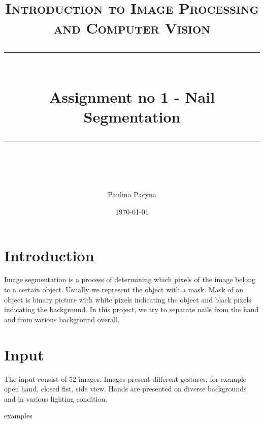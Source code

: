 \documentclass{article} %
\title{
\normalfont \normalsize
\textsc{Introduction to Image Processing and Computer Vision} \\
[10pt]
\rule{\linewidth}{0.5pt} \\[6pt]
\huge Assignment no 1 - Nail Segmentation \\
\rule{\linewidth}{2pt}  \\[10pt]
}
\author{Paulina Pacyna}
\date{\normalsize \today}
\begin{document}
\maketitle
\noindent




%
%
%
%





\section{Introduction}
Image segmentation is a process of determining which pixels of the image belong to a certain object.
Usually we represent the object with a mask. Mask of an object is binary picture with white pixels indicating the object and black pixels indicating the background. In this project, we try to separate nails from the hand and from various background overall.

\section{Input}
The input consist of 52 images. Images present different gestures, for example open hand, closed fist, side view. Hands are presented on diverse backgrounds and in various lighting condition.

examples
\end{document}
